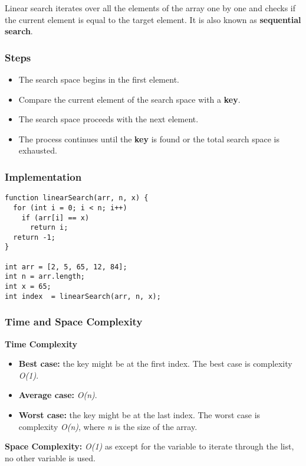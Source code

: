 Linear search iterates over all the elements of the array one by one and checks if the current element is equal to the target element. It is also known as \textbf{sequential search}.

\subsubsection*{Steps}

\begin{itemize}
  \item The search space begins in the first element.
  \item Compare the current element of the search space with a \textbf{key}.
  \item The search space proceeds with the next element.
  \item The process continues until the \textbf{key} is found or the total search space is exhausted.
\end{itemize}

\subsubsection*{Implementation}

\begin{lstlisting}[style=general]
function linearSearch(arr, n, x) {
  for (int i = 0; i < n; i++)
    if (arr[i] == x)
      return i;
  return -1;
}

int arr = [2, 5, 65, 12, 84];
int n = arr.length;
int x = 65;
int index  = linearSearch(arr, n, x);
\end{lstlisting}

\subsubsection*{Time and Space Complexity}

\textbf{Time Complexity}

\begin{itemize}
  \item \textbf{Best case:} the key might be at the first index. The best case is complexity \emph{O(1)}.
  \item \textbf{Average case:} \emph{O(n)}.
  \item \textbf{Worst case:} the key might be at the last index. The worst case is complexity \emph{O(n)}, where \textit{n} is the size of the array.
\end{itemize}

\textbf{Space Complexity:} \textit{O(1)} as except for the variable to iterate through the list, no other variable is used.

